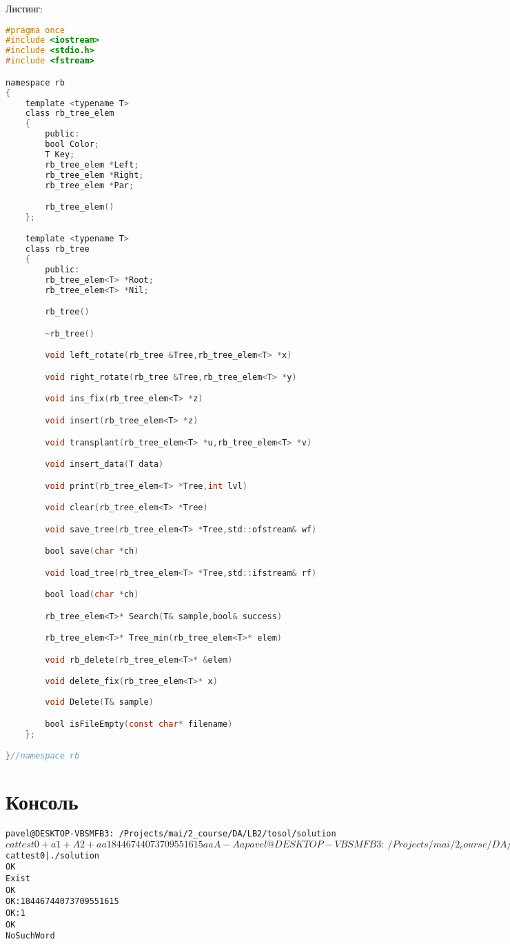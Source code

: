 \newpage
Листинг:
\begin{lstlisting}[language=C]
#pragma once
#include <iostream>
#include <stdio.h>
#include <fstream>

namespace rb
{
	template <typename T>
	class rb_tree_elem
	{
		public:
		bool Color;
		T Key;
		rb_tree_elem *Left;
		rb_tree_elem *Right;
		rb_tree_elem *Par;

		rb_tree_elem()
	};

	template <typename T>
	class rb_tree
	{
		public:
		rb_tree_elem<T> *Root;
		rb_tree_elem<T> *Nil;

		rb_tree()

		~rb_tree()

		void left_rotate(rb_tree &Tree,rb_tree_elem<T> *x)

		void right_rotate(rb_tree &Tree,rb_tree_elem<T> *y)

		void ins_fix(rb_tree_elem<T> *z)

		void insert(rb_tree_elem<T> *z)

		void transplant(rb_tree_elem<T> *u,rb_tree_elem<T> *v)

		void insert_data(T data)

		void print(rb_tree_elem<T> *Tree,int lvl)

		void clear(rb_tree_elem<T> *Tree)

		void save_tree(rb_tree_elem<T> *Tree,std::ofstream& wf)

		bool save(char *ch)

		void load_tree(rb_tree_elem<T> *Tree,std::ifstream& rf)

		bool load(char *ch)

		rb_tree_elem<T>* Search(T& sample,bool& success)

		rb_tree_elem<T>* Tree_min(rb_tree_elem<T>* elem)

		void rb_delete(rb_tree_elem<T>* &elem)

		void delete_fix(rb_tree_elem<T>* x)
		
		void Delete(T& sample)

		bool isFileEmpty(const char* filename)
	};

}//namespace rb
\end{lstlisting}
\pagebreak

\section{Консоль}
\begin{alltt}
	pavel@DESKTOP-VBSMFB3:~/Projects/mai/2_course/DA/LB2/tosol/solution$ cat test0
	+ a 1
	+ A 2
	+ aa 18446744073709551615
	aa
	A
	- A
	a
	pavel@DESKTOP-VBSMFB3:~/Projects/mai/2_course/DA/LB2/tosol/solution$ cat test0 |./solution
	OK
	Exist
	OK
	OK: 18446744073709551615
	OK: 1
	OK
	NoSuchWord
\end{alltt}
\pagebreak

